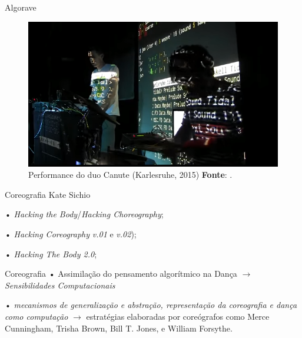 \documentclass[aspectratio=169]{beamer}
\begin{document}
\begin{frame}{Algorave}
\begin{figure}[!h]
  \centering
  \includegraphics[scale=0.5]{imagens/canute.png}
  \caption{Performance do duo Canute (Karlesruhe, 2015) \textbf{Fonte}: .}
  \label{fig:canute}
\end{figure}
\end{frame}

\begin{frame}{Coreografia}
Kate Sichio

• \emph{Hacking the Body}/\emph{Hacking Choreography};

• \emph{Hacking Coreography} \emph{v.01} e \emph{v.02});

• \emph{Hacking The Body 2.0};
\end{frame}
\begin{frame}{Coreografia}
• Assimilação do pensamento algorítmico na Dança $\rightarrow$ \emph{Sensibilidades Computacionais}  

• \emph{mecanismos de generalização e abstração, representação da coreografia e dança como computação} \cite[cap.~1, p.~2--4]{downie_choreography_2005} $\rightarrow$ estratégias elaboradas por coreógrafos como Merce Cunningham, Trisha Brown, Bill T. Jones, e William Forsythe.
\end{frame}
\end{document}
